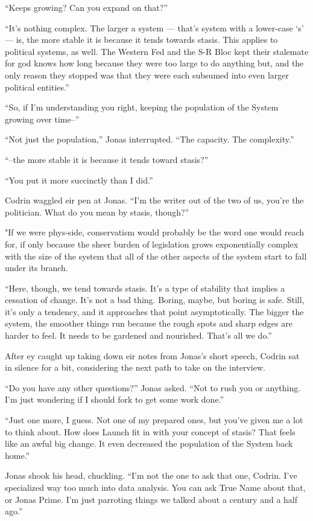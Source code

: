 ``Keeps growing? Can you expand on that?''

``It's nothing complex. The larger a system — that's system with a lower-case `s' — is, the more stable it is because it tends towards stasis. This applies to political systems, as well. The Western Fed and the S-R Bloc kept their stalemate for god knows how long because they were too large to do anything but, and the only reason they stopped was that they were each subsumed into even larger political entities.''

``So, if I'm understanding you right, keeping the population of the System growing over time--''

``Not just the population,'' Jonas interrupted. ``The capacity. The complexity.''

``--the more stable it is because it tends toward stasis?''

``You put it more succinctly than I did.''

Codrin waggled eir pen at Jonas. ``I'm the writer out of the two of us, you're the politician. What do you mean by stasis, though?''

"If we were phys-side, conservatism would probably be the word one would reach for, if only because the sheer burden of legislation grows exponentially complex with the size of the system that all of the other aspects of the system start to fall under its branch.

``Here, though, we tend towards stasis. It's a type of stability that implies a cessation of change. It's not a bad thing. Boring, maybe, but boring is safe. Still, it's only a tendency, and it approaches that point asymptotically. The bigger the system, the smoother things run because the rough spots and sharp edges are harder to feel. It needs to be gardened and nourished. That's all we do.''

After ey caught up taking down eir notes from Jonas's short speech, Codrin sat in silence for a bit, considering the next path to take on the interview.

``Do you have any other questions?'' Jonas asked. ``Not to rush you or anything. I'm just wondering if I should fork to get some work done.''

``Just one more, I guess. Not one of my prepared ones, but you've given me a lot to think about. How does Launch fit in with your concept of stasis? That feels like an awful big change. It even decreased the population of the System back home.''

Jonas shook his head, chuckling. ``I'm not the one to ask that one, Codrin. I've specialized way too much into data analysis. You can ask True Name about that, or Jonas Prime. I'm just parroting things we talked about a century and a half ago.''

